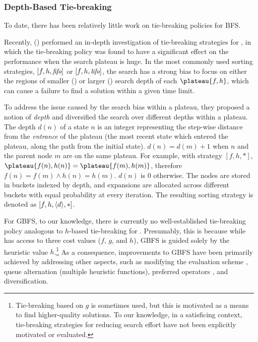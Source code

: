 \subsubsection{Depth-Based Tie-breaking}

To date, there has been relatively little work on 
tie-breaking policies for BFS.

Recently, \citeauthor{Asai2016} (\citeyear{Asai2016}) performed an in-depth investigation
of tie-breaking strategies for \astar, in which
the tie-breaking policy was found to have a
significant effect on the performance when the search plateau is huge.
In the most commonly used  sorting strategies, $[f,h,{\small\textit{fifo}}]$ or $[f,h,{\small\textit{lifo}}]$, the search has a strong bias to focus on  either the regions of smaller (\fifo) or larger (\lifo) search depth of each $\plateau{f,h}$, which can cause a failure to find a solution within a given time limit.

To address the issue caused by the search bias within a plateau,
they proposed a notion of \emph{depth} and diversified the search over different depths
within a plateau. The depth $d(n)$ of a state $n$ is an integer representing 
the step-wise distance from the \emph{entrance} of the plateau (the most recent state which
entered the plateau, along the path from the initial state). 
% 
$d(n)=d(m)+1$ when $n$ and the parent node $m$ are on the same plateau.
For example, with strategy $[f,h,*]$, 
$\plateau{f(n),h(n)}=\plateau{f(m),h(m)}$, therefore
$f(n) = f(m) \land h(n) = h(m)$.
$d(n)$ is 0 otherwise.
The nodes are stored in buckets indexed by depth, and expansions are allocated across different buckets with equal probability at every iteration.
The resulting sorting strategy is denoted as $[f,h,{\left<d\right>},*]$.

For GBFS, to our knowledge, there is currently no
well-established tie-breaking policy analogous to $h$-based tie-breaking for \astar.
Presumably, this is  because
while \astar has access to three cost values ($f$, $g$, and $h$),
GBFS is guided solely by the heuristic value $h$.\footnote{Tie-breaking based on  $g$ is sometimes used, but this is motivated as a means to find higher-quality solutions. To our knowledge, in a satisficing context, tie-breaking strategies for reducing search effort have not been explicitly motivated or evaluated.} 
As a consequence,
improvements to  GBFS have been primarily achieved by addressing other aspects, such as
modifying the evaluation scheme \cite[lazy evaluation]{richter2010lama}, queue alternation
(multiple heuristic functions), preferred operators \cite{hoffmann01}, and diversification.

